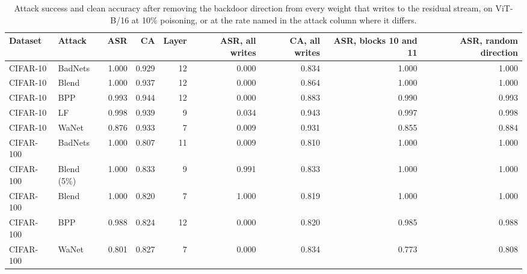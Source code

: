 \begin{table}[htbp]
\centering
\small
\caption{Attack success and clean accuracy after removing the backdoor direction from every weight that writes to the residual stream, on ViT-B/16 at 10\% poisoning, or at the rate named in the attack column where it differs.}
\label{tab:erasure}
\begin{adjustbox}{max width=\linewidth}
\begin{tabular}{llrrrrrrr}
\toprule
Dataset & Attack & ASR & CA & Layer & ASR, all writes & CA, all writes & ASR, blocks 10 and 11 & ASR, random direction \\
\midrule
CIFAR-10 & BadNets & 1.000 & 0.929 & 12 & 0.000 & 0.834 & 1.000 & 1.000 \\
CIFAR-10 & Blend & 1.000 & 0.937 & 12 & 0.000 & 0.864 & 1.000 & 1.000 \\
CIFAR-10 & BPP & 0.993 & 0.944 & 12 & 0.000 & 0.883 & 0.990 & 0.993 \\
CIFAR-10 & LF & 0.998 & 0.939 & 9 & 0.034 & 0.943 & 0.997 & 0.998 \\
CIFAR-10 & WaNet & 0.876 & 0.933 & 7 & 0.009 & 0.931 & 0.855 & 0.884 \\
CIFAR-100 & BadNets & 1.000 & 0.807 & 11 & 0.009 & 0.810 & 1.000 & 1.000 \\
CIFAR-100 & Blend (5\%) & 1.000 & 0.833 & 9 & 0.991 & 0.833 & 1.000 & 1.000 \\
CIFAR-100 & Blend & 1.000 & 0.820 & 7 & 1.000 & 0.819 & 1.000 & 1.000 \\
CIFAR-100 & BPP & 0.988 & 0.824 & 12 & 0.000 & 0.820 & 0.985 & 0.988 \\
CIFAR-100 & WaNet & 0.801 & 0.827 & 7 & 0.000 & 0.834 & 0.773 & 0.808 \\
\bottomrule
\end{tabular}
\end{adjustbox}
\end{table}
